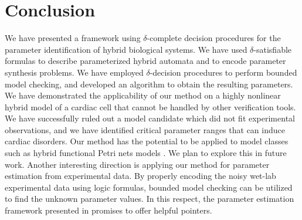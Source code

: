 \section{Conclusion}
We have presented a framework using $\delta$-complete decision procedures for the parameter identification 
of hybrid biological systems. We have used $\delta$-satisfiable formulas to describe parameterized hybrid automata 
and to encode parameter synthesis problems. We have employed $\delta$-decision procedures to perform bounded model 
checking, and developed an algorithm to obtain the resulting parameters.
We have demonstrated the applicability of our method on a highly nonlinear hybrid model of a cardiac cell that cannot
be handled by other verification tools. We have successfully ruled out a model candidate which did not fit 
experimental observations, and we have identified critical parameter ranges that can induce cardiac disorders.
Our method has the potential to be applied to model classes such as hybrid functional Petri nets models \citep{hfpn}. 
We plan to explore this in future work. Another interesting direction is applying our method for parameter estimation 
from experimental data. By properly encoding the noisy wet-lab experimental data using logic formulas, bounded model 
checking can be utilized to find the unknown parameter values. 
In this respect, the parameter estimation framework presented in \cite{liu13} promises to offer helpful pointers.









